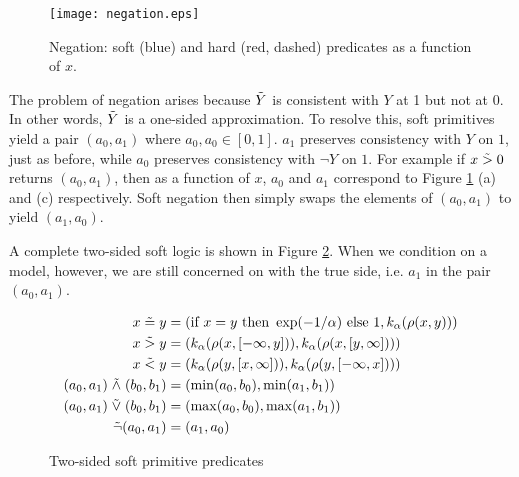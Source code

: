 \begin{figure}
\texttt{[image: negation.eps]}
\caption{Negation: soft (blue) and hard (red, dashed) predicates as a function of $x$.  }\label{negationimg}
\end{figure}


The problem of negation arises because $\tilde{Y}$ is consistent with $Y$ at 1 but not at 0.
In other words, $\tilde{Y}$ is a one-sided approximation.
To resolve this, soft primitives yield a pair $(a_0, a_1)$ where $a_0, a_0 \in [0, 1]$.
$a_1$ preserves consistency with $Y$ on $1$, just as before, while $a_0$ preserves consistency with $\neg Y$ on $1$.
For example if $x \mathrel{\tilde{>}} 0$ returns $(a_0, a_1)$, then as a function of $x$, $a_0$ and $a_1$ correspond to Figure \ref{negationimg} (a) and (c) respectively.
Soft negation then simply swaps the elements of $(a_0, a_1)$ to yield $(a_1, a_0)$.

A complete two-sided soft logic is shown in Figure \ref{softw}.
When we condition on a model, however, we are still concerned on with the true side, i.e. $a_1$ in the pair $(a_0, a_1)$.




\begin{figure}
\begin{align*}
x \mathrel{\tilde{=}} y &= (\text{if } x = y  \text{ then } \exp(-1/\alpha) \text{ else } 1, k_\alpha(\rho(x, y)))\\
x \mathrel{\tilde{>}} y &= (k_\alpha(\rho(x, [-\infty, y])), k_\alpha(\rho(x, [y, \infty])))\\
x \mathrel{\tilde{<}} y &= (k_\alpha(\rho(y, [x, \infty])), k_\alpha(\rho(y, [-\infty, x])))\\
(a_0, a_1) \mathrel{\tilde{\land}} (b_0, b_1) &= (\min(a_0, b_0), \min(a_1, b_1))\\
(a_0, a_1) \mathrel{\tilde{\lor}} (b_0, b_1) &= (\max(a_0, b_0), \max(a_1, b_1))\\
\tilde{\neg}(a_0, a_1) &= (a_1, a_0)
\end{align*}
\caption{Two-sided soft primitive predicates}
\label{softw}
\end{figure}


